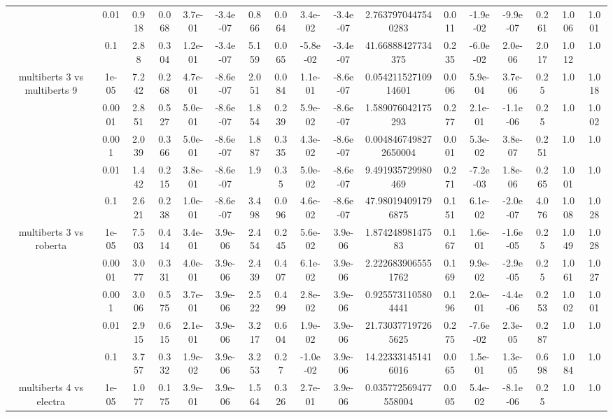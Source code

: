 \begin{tabular}{|c|c|c|c|c|c|c|c|c|c|c|c|c|c|c|c|c|}
 & 0.01 & 0.918 & 0.068 & 3.7e-01 & -3.4e-07 & 0.866 & 0.064 & 3.4e-02 & -3.4e-07 & 2.7637970447540283 & 0.011 & -1.9e-02 & -9.9e-07 & 0.261 & 1.006 & 1.001 \\
 & 0.1 & 2.88 & 0.304 & 1.2e-01 & -3.4e-07 & 5.159 & 0.065 & -5.8e-02 & -3.4e-07 & 41.66888427734375 & 0.235 & -6.0e-02 & 2.0e-06 & 2.017 & 1.012 & 1.0 \\
\hline
\multirow{5}{*}{multiberts 3 vs multiberts 9} & 1e-05 & 7.242 & 0.268 & 4.7e-01 & -8.6e-07 & 2.051 & 0.084 & 1.1e-01 & -8.6e-07 & 0.05421152710914601 & 0.006 & 5.9e-04 & 3.7e-06 & 0.25 & 1.0 & 1.018 \\
 & 0.0001 & 2.851 & 0.527 & 5.0e-01 & -8.6e-07 & 1.854 & 0.239 & 5.9e-02 & -8.6e-07 & 1.589076042175293 & 0.277 & 2.1e-01 & -1.1e-06 & 0.25 & 1.0 & 1.002 \\
 & 0.001 & 2.039 & 0.366 & 5.0e-01 & -8.6e-07 & 1.887 & 0.335 & 4.3e-02 & -8.6e-07 & 0.0048467498272650004 & 0.001 & 5.3e-02 & 3.8e-07 & 0.251 & 1.0 & 1.0 \\
 & 0.01 & 1.442 & 0.215 & 3.8e-01 & -8.6e-07 & 1.9 & 0.35 & 5.0e-02 & -8.6e-07 & 9.491935729980469 & 0.271 & -7.2e-03 & 1.8e-06 & 0.265 & 1.001 & 1.0 \\
 & 0.1 & 2.621 & 0.238 & 1.0e-01 & -8.6e-07 & 3.498 & 0.096 & 4.6e-02 & -8.6e-07 & 47.980194091796875 & 0.151 & 6.1e-02 & -2.0e-07 & 4.076 & 1.008 & 1.028 \\
\hline
\multirow{5}{*}{multiberts 3 vs roberta } & 1e-05 & 7.503 & 0.414 & 3.4e-01 & 3.9e-06 & 2.454 & 0.245 & 5.6e-02 & 3.9e-06 & 1.87424898147583 & 0.167 & 1.6e-01 & -1.6e-05 & 0.25 & 1.049 & 1.028 \\
 & 0.0001 & 3.077 & 0.331 & 4.0e-01 & 3.9e-06 & 2.439 & 0.407 & 6.1e-02 & 3.9e-06 & 2.2226839065551762 & 0.169 & 9.9e-02 & -2.9e-05 & 0.25 & 1.061 & 1.027 \\
 & 0.001 & 3.006 & 0.575 & 3.7e-01 & 3.9e-06 & 2.522 & 0.499 & 2.8e-02 & 3.9e-06 & 0.9255731105804441 & 0.196 & 2.0e-01 & -4.4e-06 & 0.253 & 1.002 & 1.001 \\
 & 0.01 & 2.915 & 0.615 & 2.1e-01 & 3.9e-06 & 3.217 & 0.604 & 1.9e-02 & 3.9e-06 & 21.730377197265625 & 0.275 & -7.6e-02 & 2.3e-05 & 0.287 & 1.0 & 1.0 \\
 & 0.1 & 3.757 & 0.332 & 1.9e-02 & 3.9e-06 & 3.253 & 0.27 & -1.0e-02 & 3.9e-06 & 14.223331451416016 & 0.065 & 1.5e-01 & 1.3e-05 & 0.698 & 1.084 & 1.0 \\
\hline
\multirow{5}{*}{multiberts 4 vs electra } & 1e-05 & 1.077 & 0.175 & 3.9e-01 & 3.9e-06 & 1.564 & 0.326 & 2.7e-01 & 3.9e-06 & 0.035772569477558004 & 0.005 & 5.4e-02 & -8.1e-06 & 0.25 & 1.0 & 1.0 \\

\end{tabular}
